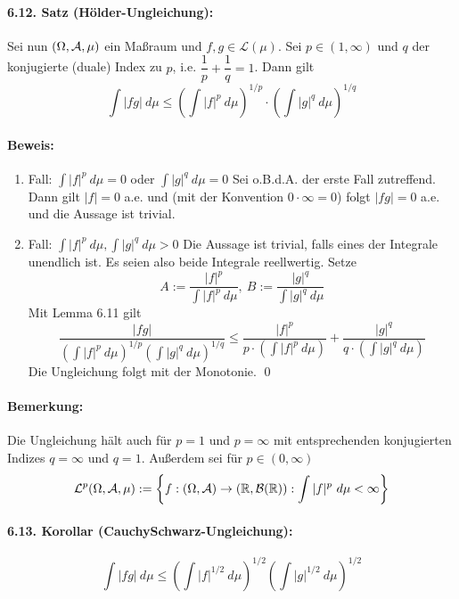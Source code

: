 \documentclass[12pt]{report}
\begin{document}
\paragraph{6.12. Satz (H\"older-Ungleichung):} Sei nun $(\Omega,\mathcal{A},\mu)$ ein Ma\ss{}raum und $f,g\in\mathcal{L}(\mu)$. Sei $p\in(1,\infty)$ und $q$ der konjugierte (duale) Index zu $p$, i.e. $\dfrac{1}{p}+\dfrac{1}{q}=1$. Dann gilt 
$$\int |fg|\ d\mu\leq\left(\int |f|^p\ d\mu\right)^{1/p}\cdot\left(\int |g|^q\ d\mu\right)^{1/q}$$

\paragraph{Beweis:}
\begin{enumerate}[label=\Roman*.]
    \item Fall: $\displaystyle\int |f|^p\ d\mu=0$ oder $\displaystyle\int |g|^q\ d\mu=0$\newline
    Sei o.B.d.A. der erste Fall zutreffend. Dann gilt $|f|=0$ a.e. und (mit der Konvention $0\cdot\infty=0$) folgt $|fg|=0$ a.e. und die Aussage ist trivial.
    \item Fall: $\displaystyle\int |f|^p\ d\mu, \displaystyle\int |g|^q\ d\mu>0$\newline
    Die Aussage ist trivial, falls eines der Integrale unendlich ist. Es seien also beide Integrale reellwertig. Setze
    $$A:=\dfrac{|f|^p}{\displaystyle\int|f|^p\ d\mu},\ B:=\dfrac{|g|^q}{\displaystyle\int|g|^q\ d\mu}$$
    Mit Lemma 6.11 gilt 
    $$\dfrac{|fg|}{\displaystyle\left(\int|f|^p\ d\mu\right)^{1/p}\displaystyle\left(\int|g|^q\ d\mu\right)^{1/q}}\leq\dfrac{|f|^p}{p\cdot\left(\displaystyle\int |f|^p\ d\mu\right)}+\dfrac{|g|^q}{q\cdot\left(\displaystyle\int |g|^q\ d\mu\right)}$$
    Die Ungleichung folgt mit der Monotonie. \qed
\end{enumerate}

\paragraph{Bemerkung:}Die Ungleichung h\"alt auch f\"ur $p=1$ und $p=\infty$ mit entsprechenden konjugierten Indizes $q=\infty$ und $q=1$. Au\ss{}erdem sei f\"ur $p\in(0,\infty)$
$$\mathcal{L}^p(\Omega,\mathcal{A},\mu):=\left\{f:(\Omega,\mathcal{A})\to(\mathbb{R},\mathcal{B}(\mathbb{R})):\int |f|^p\ d\mu<\infty\right\}$$

\paragraph{6.13. Korollar (Cauchy\textendash Schwarz-Ungleichung):}
$$\int |fg|\ d\mu\leq\left(\int |f|^{1/2}\ d\mu\right)^{1/2}\left(\int |g|^{1/2}\ d\mu\right)^{1/2}$$
\end{document}
